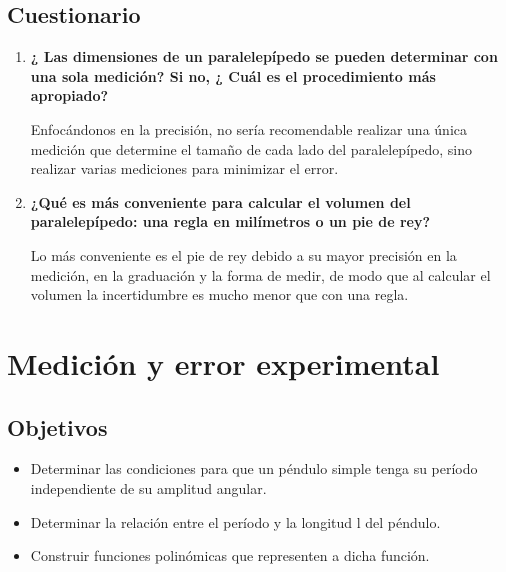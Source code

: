 \documentclass[10pt]{article}
\begin{document}
\subsection{Cuestionario}
\begin{enumerate}
    \item \textbf{¿ Las dimensiones de un paralelepípedo se pueden determinar con una sola medición? Si no, ¿ Cuál es el procedimiento más apropiado?}
    
Enfocándonos en la precisión, no sería recomendable realizar una única medición que determine el tamaño de cada lado del paralelepípedo, sino realizar varias mediciones para minimizar el error.
    \item \textbf{¿Qué es más conveniente para calcular el volumen del paralelepípedo: una regla en milímetros o un pie de rey?}

    
Lo más conveniente es el pie de rey debido a su mayor precisión en la medición, en la graduación y la forma de medir, de modo que al calcular el volumen la incertidumbre es mucho menor que con una regla.

\end{enumerate}


\newpage

\section{Medición y error experimental}

\subsection{Objetivos}
\begin{itemize}
    \item Determinar las condiciones para que un péndulo simple tenga su período independiente de su amplitud angular.
    \item Determinar la relación entre el período y la longitud l del péndulo.
    \item Construir funciones polinómicas que representen a dicha función.
\end{itemize}
\end{document}
